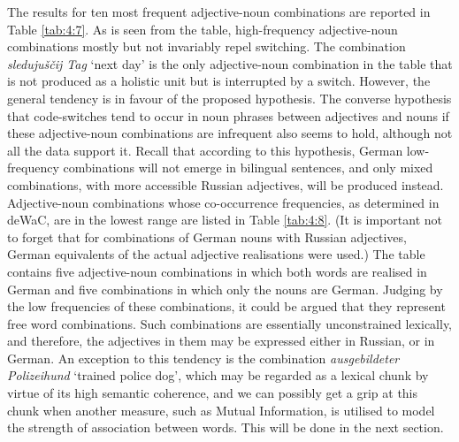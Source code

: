 The results for ten most frequent adjective-noun combinations are reported in Table \ref{tab:4:7}. As is seen from the table, high-frequency adjective-noun combinations mostly but not invariably repel switching. The combination \textit{sledujuščij Tag} `next day' is the only adjective-noun combination in the table that is not produced as a holistic unit but is interrupted by a switch. However, the general tendency is in favour of the proposed hypothesis. The converse hypothesis that code-switches tend to occur in noun phrases between adjectives and nouns if these adjective-noun combinations are infrequent also seems to hold, although not all the data support it. Recall that according to this hypothesis, German low-frequency combinations will not emerge in bilingual sentences, and only mixed combinations, with more accessible Russian adjectives, will be produced instead. Adjective-noun combinations whose co-occurrence frequencies, as determined in deWaC, are in the lowest range are listed in Table \ref{tab:4:8}. (It is important not to forget that for combinations of German nouns with Russian adjectives, German equivalents of the actual adjective realisations were used.) The table contains five adjective-noun combinations in which both words are realised in German and five combinations in which only the nouns are German. Judging by the low frequencies of these combinations, it could be argued that they represent free word combinations. Such combinations are essentially unconstrained lexically, and therefore, the adjectives in them may be expressed either in Russian, or in German. An exception to this tendency is the combination \textit{ausgebildeter Polizeihund} `trained police dog', which may be regarded as a lexical chunk by virtue of its high semantic coherence, and we can possibly get a grip at this chunk when another measure, such as Mutual Information, is utilised to model the strength of association between words. This will be done in the next section.

